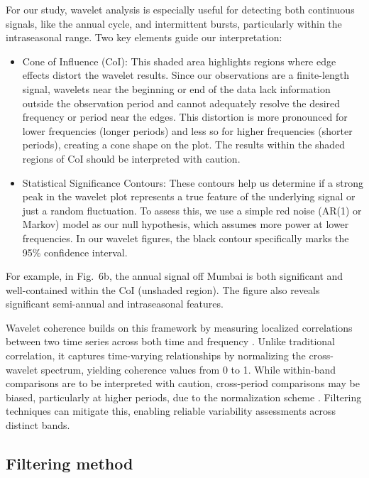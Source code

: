 \documentclass[12pt,a4paper]{article}
\begin{document}
For our study, wavelet analysis is especially useful for detecting both continuous signals, like the annual cycle, and intermittent bursts, particularly within the intraseasonal range. Two key elements guide our interpretation:

\begin{itemize}
\item Cone of Influence (CoI): This shaded area highlights regions where edge effects distort the wavelet results. Since our observations are a finite-length signal, wavelets near the beginning or end of the data lack information outside the observation period and cannot adequately resolve the desired frequency or period near the edges. This distortion is more pronounced for lower frequencies (longer periods) and less so for higher frequencies (shorter periods), creating a cone shape on the plot. The results within the shaded regions of CoI should be interpreted with caution.
\item Statistical Significance Contours: These contours help us determine if a strong peak in the wavelet plot represents a true feature of the underlying signal or just a random fluctuation. To assess this, we use a simple red noise (AR(1) or Markov) model as our null hypothesis, which assumes more power at lower frequencies. In our wavelet figures, the black contour specifically marks the 95\% confidence interval.
\end{itemize}

\noindent For example, in Fig.~6b, the annual signal off Mumbai is both significant and well-contained within the CoI (unshaded region). The figure also reveals significant semi-annual and intraseasonal features.


Wavelet coherence builds on this framework by measuring localized correlations between two time series across both time and frequency \citep{maraun2004cross}. Unlike traditional correlation, it captures time-varying relationships by normalizing the cross-wavelet spectrum, yielding coherence values from 0 to 1. While within-band comparisons are to be interpreted with caution, cross-period comparisons may be biased, particularly at higher periods, due to the normalization scheme \citep{maraun2004cross}. Filtering techniques can mitigate this, enabling reliable variability assessments across distinct bands.

\subsection{Filtering method}
\label{sec:filtering_method}
\end{document}
